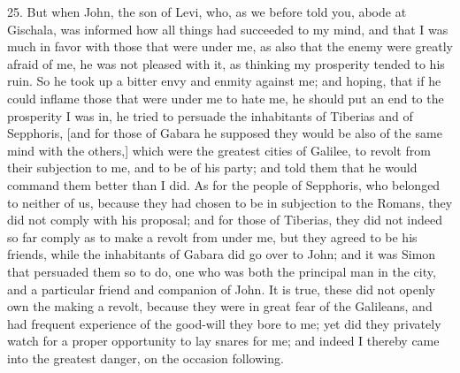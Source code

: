 25. But when John, the son of Levi, who, as we before told you, abode at
Gischala, was informed how all things had succeeded to my mind, and that I
was much in favor with those that were under me, as also that the enemy
were greatly afraid of me, he was not pleased with it, as thinking my
prosperity tended to his ruin. So he took up a bitter envy and enmity
against me; and hoping, that if he could inflame those that were under me
to hate me, he should put an end to the prosperity I was in, he tried to
persuade the inhabitants of Tiberias and of Sepphoris, [and for those of
Gabara he supposed they would be also of the same mind with the others,]
which were the greatest cities of Galilee, to revolt from their subjection
to me, and to be of his party; and told them that he would command them
better than I did. As for the people of Sepphoris, who belonged to neither
of us, because they had chosen to be in subjection to the Romans, they did
not comply with his proposal; and for those of Tiberias, they did not
indeed so far comply as to make a revolt from under me, but they agreed to
be his friends, while the inhabitants of Gabara did go over to John; and
it was Simon that persuaded them so to do, one who was both the principal
man in the city, and a particular friend and companion of John. It is
true, these did not openly own the making a revolt, because they were in
great fear of the Galileans, and had frequent experience of the good-will
they bore to me; yet did they privately watch for a proper opportunity to
lay snares for me; and indeed I thereby came into the greatest danger, on
the occasion following.


